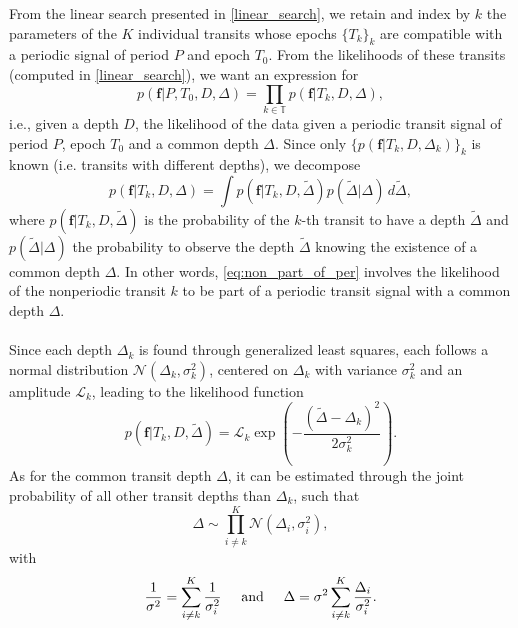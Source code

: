 \documentclass[modern]{aastex631}
\begin{document}
\newcommand{\sumTk}{i\neq k}
From the linear search presented in \autoref{linear_search}, we retain and index by $k$ the parameters of the $K$ individual transits whose epochs $\{T_k\}_k$ are compatible with a periodic signal of period $P$ and epoch $T_0$. From the likelihoods of these transits (computed in \autoref{linear_search}), we want an expression for
\begin{equation*}
    p(\bm{f} \vert P, T_0 ,D, \Delta) = \prod_{k\in\mathbb{T}} p(\bm{f} \vert T_k, D, \Delta),
\end{equation*}
i.e., given a depth $D$, the likelihood of the data given a periodic transit signal of period $P$, epoch $T_0$ and a common depth $\Delta$. Since only $\{p(\bm{f} \vert T_k, D, \Delta_k)\}_{k}$ is known (i.e. transits with different depths), we decompose
\begin{equation}\label{eq:non_part_of_per}
    p(\bm{f} \vert T_k, D, \Delta) = \int p(\bm{f} \vert T_k, D, \tilde\Delta)p(\tilde\Delta | \Delta)\, d\tilde\Delta,
\end{equation}
where $p(\bm{f} \vert T_k, D, \tilde\Delta)$ is the probability of the $k$-th transit to have a depth $\tilde\Delta$ and $p(\tilde\Delta | \Delta)$ the probability to observe the depth $\tilde\Delta$ knowing the existence of a common depth $\Delta$. In other words, \autoref{eq:non_part_of_per} involves the likelihood of the nonperiodic transit $k$ to be part of a periodic transit signal with a common depth $\Delta$.
\\\\
Since each depth $\Delta_k$ is found through generalized least squares, each follows a normal distribution $\mathcal{N}(\Delta_k, \sigma_k^2)$, centered on $\Delta_k$ with variance $\sigma_k^2$ and an amplitude $\mathcal{L}_k$, leading to the likelihood function
\begin{equation*}
    p(\bm{f} \vert T_k, D, \tilde\Delta) = \mathcal{L}_k\exp \left(-\frac{(\tilde\Delta-\Delta_k)^2}{2\sigma_k^2}\right).
\end{equation*}
As for the common transit depth $\Delta$, it can be estimated through the joint probability of all other transit depths than $\Delta_k$, such that
\begin{equation*}
    \Delta \sim \prod_{\sumTk}^K \mathcal{N}(\Delta_i, \sigma_i^2),
\end{equation*}
with 
\begin{equation}\label{eq:params}
\frac{1}{\sigma^2} = \sum_{\sumTk}^K \frac{1}{\sigma_i^2} \hspace{0.5cm} \text{and} \hspace{0.5cm}
\Delta =\sigma^2 \sum_{\sumTk}^K {\frac{\Delta_i}{\sigma_i^2}}.
\end{equation}
\end{document}
